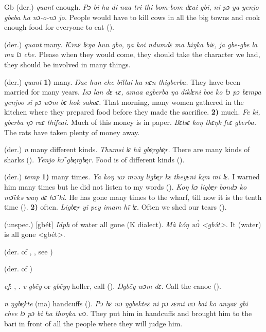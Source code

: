 \begin{letter}{Gb}
 (der.) \textit{quant} enough. \textit{Pɔ bi ha di naa tri thi bom-bom dɛai gbi, ni pɔ ya yenjo gbeba ha nɔ-o-nɔ jo.} People would have to kill cows in all the big towns and cook enough food for everyone to eat (\citealt{Sumner1921}). 

 (der.) \textit{quant} many. \textit{Kɔnɛ lɛŋa hun gbo, ŋa koi ndumdɛ ma hiŋka biɛ, ja gbe-gbe la ma lɔ che.} Please when they would come, they should take the character we had, they should be involved in many things.

 (der.) \textit{quant} \textbf{1)} many. \textit{Ŋae hun che billai ha nɛn thigberba.} They have been married for many years. \textit{Isɔ lan dɛ vɛ, amaa agberba ŋa diklɛni boe ko lɔ pɔ bɛmpa yenjoo si pɔ wɔm bɛ hok sakaɛ.} That morning, many women gathered in the kitchen where they prepared food before they made the sacrifice. \textbf{2)} much. \textit{Fe ki, gberba ŋɔ raɛ thifeai.} Much of this money is in paper. \textit{Bɛlsɛ koŋ thɛŋk feɛ gberba.} The rats have taken plenty of money away.

 (der.) \textit{n} many different kinds. \textit{Thumsi lɛ hã gbe̹rgbe̹r.} There are many kinds of sharks (\citealt{Pichl1967}). \textit{Yenjo hɔ̃ gbe̹rgbe̹r.} Food is of different kinds (\citealt{Pichl1967}). 

 (der.) \textit{temp} \textbf{1)} many times. \textit{Ya koŋ wɔ məəy ligbe̹r kɛ theyɛni lo̹m mi lɛ.} I warned him many times but he did not listen to my words (\citealt{Pichl1967}). \textit{Koŋ kɔ ligbe̹r bondɔ ko mɔ̃ekə waŋ dɛ hɔ̃ ki.} He has gone many times to the wharf, till now it is the tenth time (\citealt{Pichl1967}). 
\textbf{2)} often. \textit{Ligbe̹r yi pey imam hĩ lɛ.} Often we shed our tears (\citealt{Pichl1967}). 

 (unspec.) [gbét] \textit{Idph} of water all gone (K dialect). \textit{Mà kóŋ wɔ̀ <gbə́t>.} It (water) is all gone <gbét>. 

 (der. of , , see ) 

 (der. of ) 

 \textit{cf}: , . \textit{v} \textit{gbẽy} or \textit{gbẽyŋ} holler, call (\citealt{Pichl1967}). \textit{Ŋgbẽy wɔm dɛ.} Call the canoe (\citealt{Pichl1967}). 

 \textit{n} \textit{ŋgbe̹kte} (ma) handcuffs (\citealt{Pichl1967}). \textit{Pɔ bɛ wɔ ŋgbekteɛ ni pɔ sɛmi wɔ bai ko anyaɛ gbi chee lɔ pɔ bi ha thoŋka wɔ.} They put him in handcuffs and brought him to the bari in front of all the people where they will judge him.


\end{letter}
